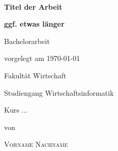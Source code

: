 \newcommand{\typMeinerArbeit}{Bachelorarbeit}

\newcommand{\themaMeinerArbeit}{Mein Titel}

\newcommand{\meinName}{Vorname Nachname}

\thispagestyle{empty}

\begin{spacing}{1}
  \begin{center}
    ~\vspace{0mm}

    {\sffamily
      \LARGE
      \textbf{Titel der Arbeit}

      \bigskip
      \textbf{ggf. etwas länger}
    }


    \vspace{15mm}

    {\Large \typMeinerArbeit}

    \vspace{1cm}

    vorgelegt am \today

    \vspace{15mm}

    Fakultät Wirtschaft
    \medskip

    Studiengang Wirtschaftsinformatik
    \medskip

    Kurs ...

    \vspace{10mm}

    von

    \vspace{10mm}

    {\large\textsc{\meinName}}

    \vspace{10mm}
  \end{center}

  \vfill


\end{spacing}
